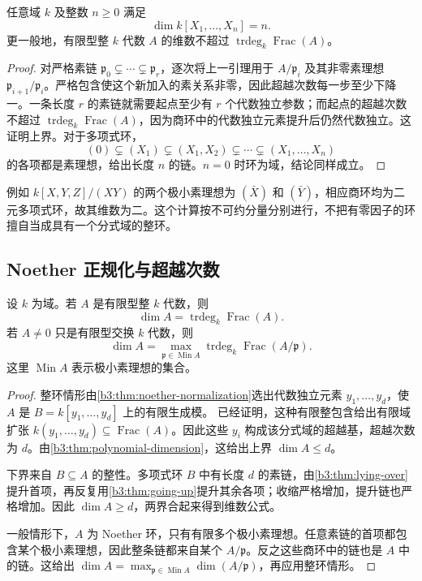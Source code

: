 \begin{theorem}\label{b3:thm:polynomial-dimension}
	任意域 \(k\) 及整数 \(n\ge0\) 满足
	\[
		\dim k[X_1,\ldots,X_n]=n.
	\]
	更一般地，有限型整 \(k\) 代数 \(A\) 的维数不超过 \(\operatorname{trdeg}_k\operatorname{Frac}(A)\)。
\end{theorem}
\begin{proof}
	对严格素链 \(\mathfrak p_0\subsetneq\cdots\subsetneq\mathfrak p_r\)，逐次将上一引理用于 \(A/\mathfrak p_i\) 及其非零素理想 \(\mathfrak p_{i+1}/\mathfrak p_i\)。严格包含使这个新加入的素关系非零，因此超越次数每一步至少下降一。一条长度 \(r\) 的素链就需要起点至少有 \(r\) 个代数独立参数；而起点的超越次数不超过 \(\operatorname{trdeg}_k\operatorname{Frac}(A)\)，因为商环中的代数独立元素提升后仍然代数独立。这证明上界。对于多项式环，
	\[
		(0)\subsetneq(X_1)\subsetneq(X_1,X_2)\subsetneq\cdots \subsetneq(X_1,\ldots,X_n)
	\]
	的各项都是素理想，给出长度 \(n\) 的链。\(n=0\) 时环为域，结论同样成立。
\end{proof}

例如 \(k[X,Y,Z]/(XY)\) 的两个极小素理想为 \((\bar X)\) 和 \((\bar Y)\)，相应商环均为二元多项式环，故其维数为二。这个计算按不可约分量分别进行，不把有零因子的环擅自当成具有一个分式域的整环。

\subsection{Noether 正规化与超越次数}
\label{b3:subsec:0903:02}

\begin{theorem}\label{b3:thm:affine-dimension}\label{b3:thm:affine-dimension-trdeg}
	设 \(k\) 为域。若 \(A\) 是有限型整 \(k\) 代数，则
	\[
		\dim A=\operatorname{trdeg}_k\operatorname{Frac}(A).
	\]
	若 \(A\ne0\) 只是有限型交换 \(k\) 代数，则
	\[
		\dim A=\max_{\mathfrak p\in\operatorname{Min}A} \operatorname{trdeg}_k\operatorname{Frac}(A/\mathfrak p).
	\]
	这里 \(\operatorname{Min}A\) 表示极小素理想的集合。
\end{theorem}
\begin{proof}
	整环情形由\cref{b3:thm:noether-normalization}选出代数独立元素 \(y_1,\ldots,y_d\)，使 \(A\) 是 \(B=k[y_1,\ldots,y_d]\) 上的有限生成模。 已经证明，这种有限整包含给出有限域扩张 \(k(y_1,\ldots,y_d)\subseteq\operatorname{Frac}(A)\)。因此这些 \(y_i\) 构成该分式域的超越基，超越次数为 \(d\)。由\cref{b3:thm:polynomial-dimension}，这给出上界 \(\dim A\le d\)。

	下界来自 \(B\subseteq A\) 的整性。多项式环 \(B\) 中有长度 \(d\) 的素链，由\cref{b3:thm:lying-over}提升首项，再反复用\cref{b3:thm:going-up}提升其余各项；收缩严格增加，提升链也严格增加。因此 \(\dim A\ge d\)，两界合起来得到维数公式。

	一般情形下，\(A\) 为 Noether 环，只有有限多个极小素理想。任意素链的首项都包含某个极小素理想，因此整条链都来自某个 \(A/\mathfrak p\)。反之这些商环中的链也是 \(A\) 中的链。这给出 \(\dim A=\max_{\mathfrak p\in\operatorname{Min}A}\dim(A/\mathfrak p)\)，再应用整环情形。
\end{proof}

